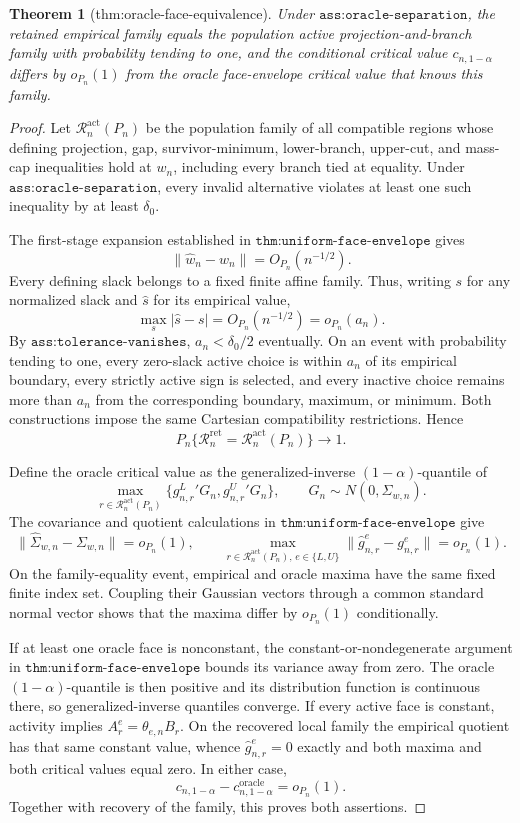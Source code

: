 \documentclass{article}
\newtheorem{theorem}{Theorem}
\begin{document}
\begin{theorem}[thm:oracle-face-equivalence]\label{thm:oracle-face-equivalence}
Under \(\texttt{ass:oracle-separation}\), the retained empirical family equals the population active projection-and-branch family with probability tending to one, and the conditional critical value \(c_{n,1-\alpha}\) differs by \(o_{P_n}(1)\) from the oracle face-envelope critical value that knows this family.
\end{theorem}
\begin{proof}
Let \(\mathcal R_n^{\mathrm{act}}(P_n)\) be the population family of all compatible regions whose defining projection, gap, survivor-minimum, lower-branch, upper-cut, and mass-cap inequalities hold at \(w_n\), including every branch tied at equality. Under \(\texttt{ass:oracle-separation}\), every invalid alternative violates at least one such inequality by at least \(\delta_0\).

The first-stage expansion established in \(\texttt{thm:uniform-face-envelope}\) gives
\[
 \lVert\widehat w_n-w_n\rVert=O_{P_n}(n^{-1/2}).
\]
Every defining slack belongs to a fixed finite affine family. Thus, writing \(s\) for any normalized slack and \(\widehat s\) for its empirical value,
\[
 \max_s|\widehat s-s|=O_{P_n}(n^{-1/2})=o_{P_n}(a_n).
\]
By \(\texttt{ass:tolerance-vanishes}\), \(a_n<\delta_0/2\) eventually. On an event with probability tending to one, every zero-slack active choice is within \(a_n\) of its empirical boundary, every strictly active sign is selected, and every inactive choice remains more than \(a_n\) from the corresponding boundary, maximum, or minimum. Both constructions impose the same Cartesian compatibility restrictions. Hence
\[
 P_n\{\mathcal R_n^{\mathrm{ret}}=\mathcal R_n^{\mathrm{act}}(P_n)\}
 \longrightarrow1.
\]

Define the oracle critical value as the generalized-inverse \((1-\alpha)\)-quantile of
\[
 \max_{r\in\mathcal R_n^{\mathrm{act}}(P_n)}
 \{g^L_{n,r}{}'G_n,g^U_{n,r}{}'G_n\},
 \qquad G_n\sim N(0,\Sigma_{w,n}).
\]
The covariance and quotient calculations in \(\texttt{thm:uniform-face-envelope}\) give
\[
 \lVert\widehat\Sigma_{w,n}-\Sigma_{w,n}\rVert=o_{P_n}(1),
 \qquad
 \max_{r\in\mathcal R_n^{\mathrm{act}}(P_n),\,e\in\{L,U\}}
 \lVert\widehat g^e_{n,r}-g^e_{n,r}\rVert=o_{P_n}(1).
\]
On the family-equality event, empirical and oracle maxima have the same fixed finite index set. Coupling their Gaussian vectors through a common standard normal vector shows that the maxima differ by \(o_{P_n}(1)\) conditionally.

If at least one oracle face is nonconstant, the constant-or-nondegenerate argument in \(\texttt{thm:uniform-face-envelope}\) bounds its variance away from zero. The oracle \((1-\alpha)\)-quantile is then positive and its distribution function is continuous there, so generalized-inverse quantiles converge. If every active face is constant, activity implies \(A_r^e=\theta_{e,n}B_r\). On the recovered local family the empirical quotient has that same constant value, whence \(\widehat g^e_{n,r}=0\) exactly and both maxima and both critical values equal zero. In either case,
\[
 c_{n,1-\alpha}-c^{\mathrm{oracle}}_{n,1-\alpha}=o_{P_n}(1).
\]
Together with recovery of the family, this proves both assertions.
\end{proof}
\end{document}

